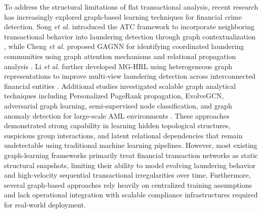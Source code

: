 \documentclass[conference]{IEEEtran}
\begin{document}
To address the structural limitations of flat transactional analysis, recent research has increasingly explored graph-based learning techniques for financial crime detection. Song \textit{et al.} introduced the ATC framework to incorporate neighboring transactional behavior into laundering detection through graph contextualization \cite{song2026}, while Cheng \textit{et al.} proposed GAGNN for identifying coordinated laundering communities using graph attention mechanisms and relational propagation analysis \cite{cheng2023}. Li \textit{et al.} further developed MG-HRL using heterogeneous graph representations to improve multi-view laundering detection across interconnected financial entities \cite{li2025}. Additional studies investigated scalable graph analytical techniques including Personalized PageRank propagation, EvolveGCN, adversarial graph learning, semi-supervised node classification, and graph anomaly detection for large-scale AML environments \cite{gezici2025, karim2024, balaji2025}. These approaches demonstrated strong capability in learning hidden topological structures, suspicious group interactions, and latent relational dependencies that remain undetectable using traditional machine learning pipelines. However, most existing graph-learning frameworks primarily treat financial transaction networks as static structural snapshots, limiting their ability to model evolving laundering behavior and high-velocity sequential transactional irregularities over time. Furthermore, several graph-based approaches rely heavily on centralized training assumptions and lack operational integration with scalable compliance infrastructures required for real-world deployment.
\end{document}
